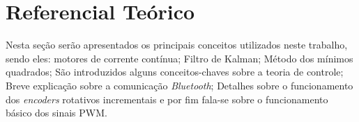 \chapter[Referencial Teórico]{Referencial Teórico}
\label{ch:referencial_teorico}

Nesta seção serão apresentados os principais conceitos utilizados neste trabalho, sendo eles: motores de corrente contínua; Filtro de Kalman; Método dos mínimos quadrados; São introduzidos alguns conceitos-chaves sobre a teoria de controle; Breve explicação sobre a comunicação \emph{Bluetooth}; Detalhes sobre o funcionamento dos \emph{encoders} rotativos incrementais e por fim fala-se sobre o funcionamento básico dos sinais PWM.







